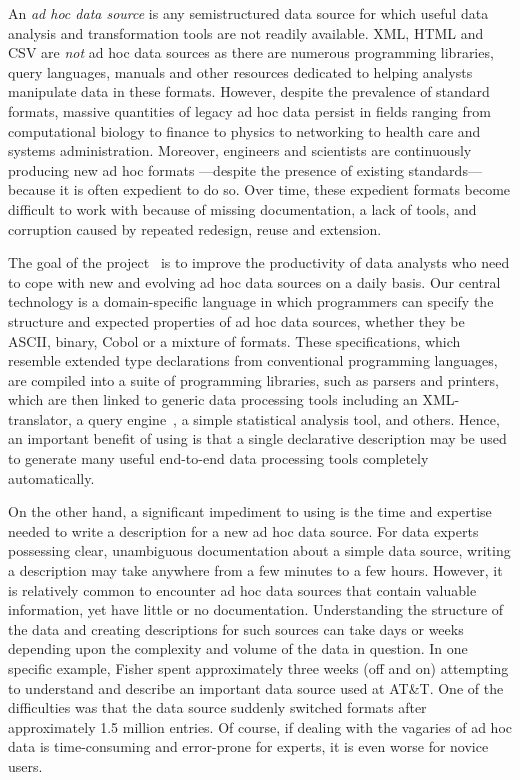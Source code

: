 
An {\em ad hoc data source} is any semistructured data source
for which useful data analysis and transformation tools
are not readily available. XML, HTML and CSV are {\em not} 
ad hoc data sources as there are numerous programming libraries,
query languages, manuals and other resources dedicated to
helping analysts manipulate data in these formats.
However, despite the prevalence of standard formats,
massive quantities of legacy ad hoc data persist in fields ranging from
computational biology to finance to physics to networking to health care and
systems administration.  Moreover, engineers and scientists are continuously
producing new ad hoc formats ---despite the presence of existing 
standards--- because it is often expedient to do so.  Over time, these
expedient formats become difficult to work with because of missing
documentation, a lack of tools, and corruption caused by repeated
redesign, reuse and extension.

The goal of the \pads{}
project~\cite{fisher+:pads,fisher+:popl06,mandelbaum+:pads-ml,padsweb}
is to improve the productivity of data analysts who need to cope with
new and evolving ad hoc data sources on a daily basis.  Our central
technology is a domain-specific language in which programmers can
specify the structure and expected properties of ad hoc data sources,
whether they be ASCII, binary, Cobol or a mixture of formats.  These
specifications, which resemble extended type declarations from
conventional programming languages, are compiled into a suite of
programming libraries, such as parsers and printers, which are then
linked to generic 
data processing tools including an XML-translator, a query
engine~\cite{fernandez+:padx}, a 
simple statistical analysis tool, and others.  Hence, an important
benefit of using \pads{} is that  a single declarative description
may be used to generate many useful end-to-end data processing tools completely
automatically.

On the other hand, a significant impediment to using \pads{}
is the time and expertise needed
to write a \pads{} description for a new ad hoc data source.
For data experts possessing clear, unambiguous documentation about a
simple data source, writing a \pads{} description may take 
anywhere from a few minutes to a few hours.  However,
it is relatively common to encounter ad hoc data sources that 
contain valuable information, yet have little or no documentation.
Understanding the structure of the data and creating descriptions for such 
sources can take days or weeks depending upon the complexity
and volume of the data in question.  In one specific example, Fisher
spent approximately three weeks (off and on) attempting to understand
and describe an important data source used at AT\&T.  One
of the difficulties was that the data source suddenly 
switched formats after approximately 1.5 million entries.  Of course,
if dealing with the vagaries of ad hoc data is
time-consuming and error-prone for experts, it is even worse for
novice users.

